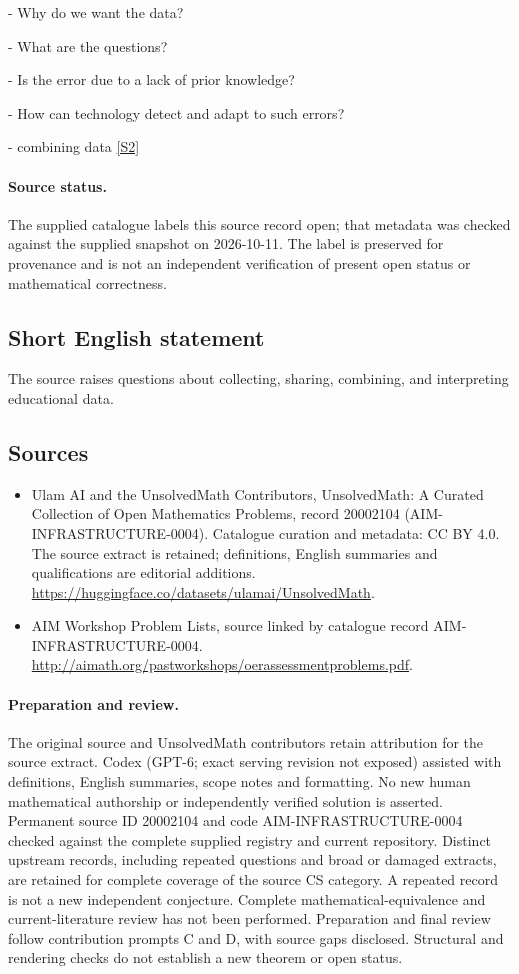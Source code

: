 \documentclass[11pt]{article}
\newcommand{\sref}[2]{\hyperlink{source:#1:#2}{[S#2]}}
\begin{document}
- Why do we want the data?

- What are the questions?

- Is the error due to a lack of prior knowledge?

- How can technology detect and adapt to such errors?

- combining data \sref{20002104}{2}
\paragraph{Source status.}
The supplied catalogue labels this source record open; that metadata was checked against the supplied snapshot on 2026-10-11. The label is preserved for provenance and is not an independent verification of present open status or mathematical correctness.
\subsection{Short English statement}
The source raises questions about collecting, sharing, combining, and interpreting educational data.
\subsection{Sources}
\begin{itemize}
\item[\hypertarget{source:20002104:1}{S1}] Ulam AI and the UnsolvedMath Contributors, UnsolvedMath: A Curated Collection of Open Mathematics Problems, record 20002104 (AIM-INFRASTRUCTURE-0004). Catalogue curation and metadata: CC BY 4.0. The source extract is retained; definitions, English summaries and qualifications are editorial additions.
\url{https://huggingface.co/datasets/ulamai/UnsolvedMath}.
\item[\hypertarget{source:20002104:2}{S2}] AIM Workshop Problem Lists, source linked by catalogue record AIM-INFRASTRUCTURE-0004.
\url{http://aimath.org/pastworkshops/oerassessmentproblems.pdf}.
\end{itemize}
\paragraph{Preparation and review.}
The original source and UnsolvedMath contributors retain attribution for the source extract. Codex (GPT-6; exact serving revision not exposed) assisted with definitions, English summaries, scope notes and formatting. No new human mathematical authorship or independently verified solution is asserted. Permanent source ID 20002104 and code AIM-INFRASTRUCTURE-0004 checked against the complete supplied registry and current repository. Distinct upstream records, including repeated questions and broad or damaged extracts, are retained for complete coverage of the source CS category. A repeated record is not a new independent conjecture. Complete mathematical-equivalence and current-literature review has not been performed. Preparation and final review follow contribution prompts C and D, with source gaps disclosed. Structural and rendering checks do not establish a new theorem or open status.
\label{end:20002104}
\end{document}
